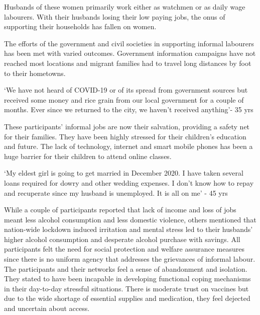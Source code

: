 \documentclass[final]{beamer}
\newlength{\colwidth}
\begin{document}
\begin{frame}[t]
\begin{columns}[t]
\begin{column}{\colwidth}

Husbands of these women
primarily work either as
watchmen or as daily wage
labourers. With their husbands
losing their low paying jobs,
the onus of supporting their
households has fallen on women.
\vspace{0.5cm}

The efforts of the government
and civil societies in supporting
informal labourers has been
met with varied outcomes.
Government information
campaigns have not reached
most locations and migrant
families had to travel long
distances by foot to their
hometowns.


  \begin{alertblock}{}

‘We have not heard of COVID-19 or
of its spread from government
sources but received some money
and rice grain from our local
government for a couple of
months. Ever since we returned to
the city, we haven’t received
anything’- 35 yrs

  \end{alertblock}

  These participants’ informal
jobs are now their salvation,
providing a safety net for their
families. They have been highly
stressed for their children’s
education and future. The lack
of technology, internet and
smart mobile phones has been
a huge barrier for their children
to attend online classes.

  \begin{alertblock}{}

‘My eldest girl is going to get
married in December 2020. I
have taken several loans required
for dowry and other wedding
expenses. I don’t know how to
repay and recuperate since my
husband is unemployed. It is all
on me’ - 45 yrs

  \end{alertblock}

  While a couple of participants
reported that lack of income and
loss of jobs meant less alcohol
consumption and less domestic
violence, others mentioned that
nation-wide lockdown induced
irritation and mental stress led to
their husbands’ higher alcohol
consumption and desperate
alcohol purchase with savings. All
participants felt the need for
social protection and welfare
assurance measures since there
is no uniform agency that
addresses the grievances of
informal labour. The participants
and their networks feel a sense of
abandonment and isolation. They
stated to have been incapable in
developing functional coping
mechanisms in their day-to-day
stressful situations. There
is moderate trust on vaccines but
due to the wide shortage of
essential supplies and
medication, they feel dejected
and uncertain about access.


\end{column}
\end{columns}
\end{frame}
\end{document}
